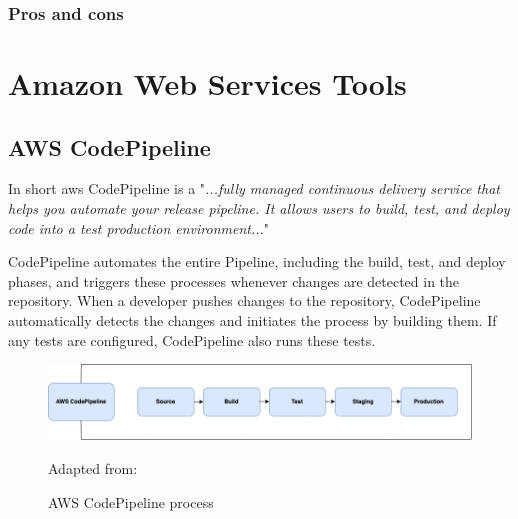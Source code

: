 \subsubsection{Pros and cons}


\section{Amazon Web Services Tools}

\subsection{AWS CodePipeline}
In short \acrshort{aws} CodePipeline is a "\textit{...fully managed continuous delivery service that helps you automate your release pipeline. It allows users to build, test, and deploy code into a test production environment...}"
\cite{AWSCodePipeline}

CodePipeline automates the entire \gls{Pipeline}, including the build, test, and deploy phases, and triggers these processes whenever changes are detected in the repository. When a developer pushes changes to the repository, CodePipeline automatically detects the changes and initiates the process by building them. If any tests are configured, CodePipeline also runs these tests.\cite{AWSCodePipeline1}
\begin{figure}[H]
    \centering
    \includegraphics[scale=0.4]{Images/CodePipeline.png}
    \caption{AWS CodePipeline process}Adapted from: \cite{AWSCodePipeline2}
    \label{fig: AWS CodePipeline Process}
\end{figure}

